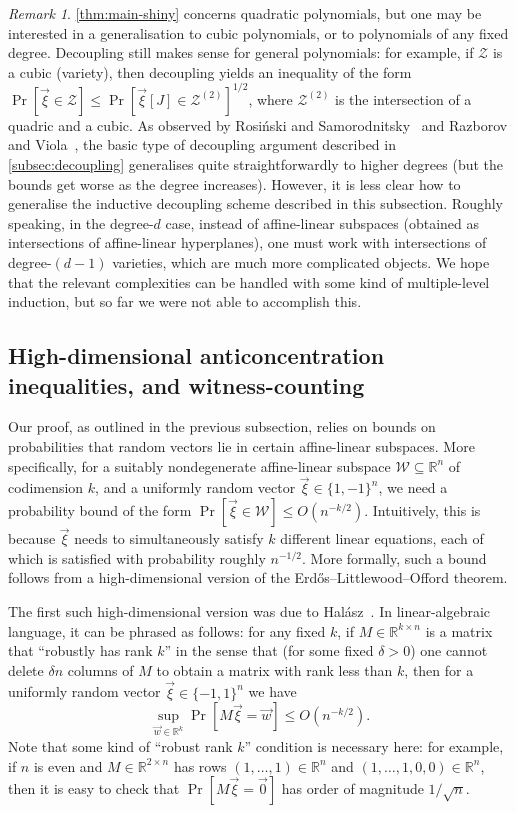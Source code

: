 \documentclass[english]{article}
\theoremstyle{remark}
\newtheorem{remark}{Remark}[section]
\numberwithin{equation}{section}
\numberwithin{figure}{section}
\newcommand{\RR}{\mathbb{R}}
\newcommand{\mb}{\mathbb}
\newcommand{\mc}{\mathcal}
\begin{document}
\begin{remark}\label{rem:high-degree-issues}
\cref{thm:main-shiny} concerns quadratic polynomials, but one may be interested in a generalisation to cubic polynomials, or to polynomials of any fixed degree. Decoupling still makes sense for general polynomials: for example, if $\mathcal Z$ is a cubic (variety), then decoupling yields an inequality of the form $\Pr[\vec \xi\in \mc Z]\le \Pr[\vec\xi[J]\in \mc Z^{(2)}]^{1/2}$, where $\mc Z^{(2)}$ is the intersection of a quadric and a cubic. As observed by Rosi\'nski and Samorodnitsky~\cite{RS96} and Razborov and Viola~\cite{RV13}, the basic type of decoupling argument described in \cref{subsec:decoupling} generalises quite straightforwardly to higher degrees (but the bounds get worse as the degree increases). However, it is less clear how to generalise the inductive decoupling scheme described in this subsection. Roughly speaking, in the degree-$d$ case, instead of affine-linear subspaces (obtained as intersections of affine-linear hyperplanes), one must work with intersections of degree-$(d-1)$ varieties, which are much more complicated objects. We hope that the relevant complexities can be handled with some kind of multiple-level induction, but so far we were not able to accomplish this.
\end{remark}

\subsection{High-dimensional anticoncentration inequalities, and witness-counting}
\label{subsec:witness-count}

Our proof, as outlined in the previous subsection, relies on bounds on probabilities that random vectors lie in certain affine-linear subspaces. More specifically, for a suitably nondegenerate affine-linear subspace $\mc W\subseteq \RR^n$ of codimension $k$, and a uniformly random vector $\vec{\xi}\in \{1,-1\}^n$, we need a probability bound of the form $\Pr[\vec \xi\in \mc W]\le O(n^{-k/2})$. Intuitively, this is because $\vec \xi$ needs to simultaneously satisfy $k$ different linear equations, each of which is satisfied with probability roughly $n^{-1/2}$. More formally, such a bound follows from a high-dimensional version of the Erd\H os--Littlewood--Offord theorem.

The first such high-dimensional version was due to Hal\'asz~\cite{Hal77}. In linear-algebraic language, it can be phrased as follows: for any fixed $k$, if $M\in \mb R^{k\times n}$ is a matrix that ``robustly has rank $k$'' in the sense that (for some fixed $\delta>0$) one cannot delete $\delta n$ columns of $M$ to obtain a matrix with rank less than $k$, then for a uniformly random vector $\vec \xi\in\{-1,1\}^n$ we have
\[\sup_{\vec w\in \mb R^k}\Pr[M\vec \xi=\vec w]\le O(n^{-k/2}).\]
Note that some kind of ``robust rank $k$'' condition is necessary here: for example, if $n$ is even and $M\in \RR^{2\times n}$ has rows $(1,\dots,1)\in \RR^n$ and $(1,\dots,1,0,0)\in \RR^n$, then it is easy to check that $\Pr[M\vec \xi=\vec 0]$ has order of magnitude $1/\sqrt n$.
\end{document}
